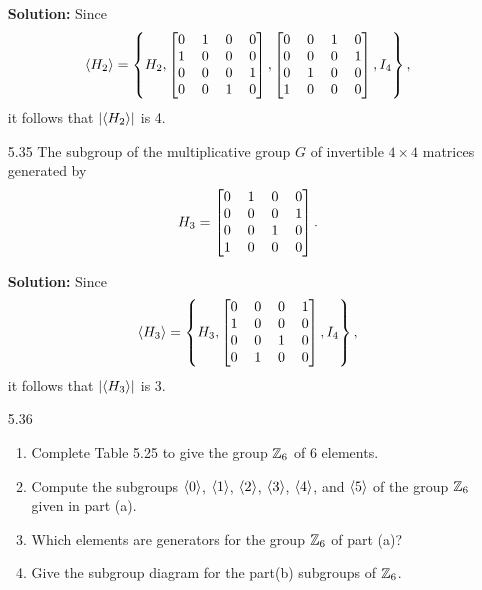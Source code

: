 \begin{enumerate}
      \textbf{Solution:} Since
      $$\cyc{H_2} = \left\{H_2, \left[
           \begin{tabular}{@{}c c c c@{}}
              0 & 1 & 0 & 0 \\
              1 & 0 & 0 & 0 \\
              0 & 0 & 0 & 1 \\
              0 & 0 & 1 & 0
           \end{tabular}\right], \left[
           \begin{tabular}{@{}c c c c@{}}
              0 & 0 & 1 & 0 \\
              0 & 0 & 0 & 1 \\
              0 & 1 & 0 & 0 \\
              1 & 0 & 0 & 0
           \end{tabular}\right], I_4\right\},$$
      it follows that $|\langle H_2 \rangle|$ is 4.   
   \item[5.35] The subgroup of the multiplicative group $G$ of invertible
               $4 \times 4$ matrices generated by
               $$H_3 = \left[
                  \begin{tabular}{@{}c c c c@{}}
                     0 & 1 & 0 & 0 \\
                     0 & 0 & 0 & 1 \\
                     0 & 0 & 1 & 0 \\
                     1 & 0 & 0 & 0
                  \end{tabular}\right].$$

      \textbf{Solution:} Since
      $$\cyc{H_3} = \left\{H_3, \left[
           \begin{tabular}{@{}c c c c@{}}
              0 & 0 & 0 & 1 \\
              1 & 0 & 0 & 0 \\
              0 & 0 & 1 & 0 \\
              0 & 1 & 0 & 0
           \end{tabular}\right], I_4\right\},$$
      it follows that $|\langle H_3 \rangle|$ is 3.
   \item[5.36] \begin{enumerate}
                  \item Complete Table 5.25 to give the group $\mathbb{Z}_6$ of 6 
                        elements.
                  \item Compute the subgroups $\langle 0 \rangle$, $\langle 1 \rangle$, $\langle 2 \rangle$,
                        $\langle 3 \rangle$, $\langle 4 \rangle$, and $\langle 5 \rangle$ of the group $\mathbb{Z}_6$
                        given in part (a).
                  \item Which elements are generators for the group $\mathbb{Z}_6$ of 
                        part (a)?
                  \item Give the subgroup diagram for the part(b) subgroups of
                        $\mathbb{Z}_6$.
               \end{enumerate}


\end{enumerate}
